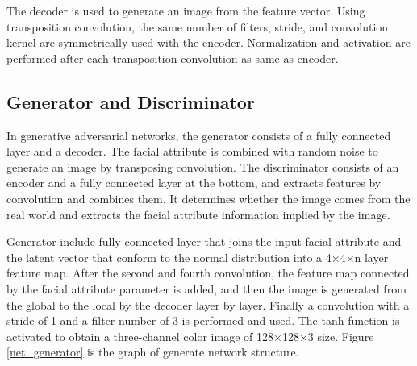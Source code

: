 The decoder is used to generate an image from the feature vector.
Using transposition convolution, the same number of filters,
    stride, and convolution kernel are symmetrically used with the encoder.
Normalization and activation are performed after each transposition convolution as same as encoder.


\subsection{Generator and Discriminator}

In generative adversarial networks, the generator consists of a fully connected layer and a decoder.
The facial attribute is combined with random noise to generate an image by transposing convolution.
The discriminator consists of an encoder and a fully connected layer at the bottom, and extracts features by convolution and combines them.
It determines whether the image comes from the real world and extracts the facial attribute information implied by the image.

Generator include fully connected layer that joins the input facial attribute and the latent vector that conform to the normal distribution into a 4×4×n layer feature map.
After the second and fourth convolution, the feature map connected by the facial attribute parameter is added,
    and then the image is generated from the global to the local by the decoder layer by layer.
Finally a convolution with a stride of 1 and a filter number of 3 is performed and used.
The tanh function is activated to obtain a three-channel color image of 128×128×3 size.
Figure \ref{net_generator} is the graph of generate network structure.


